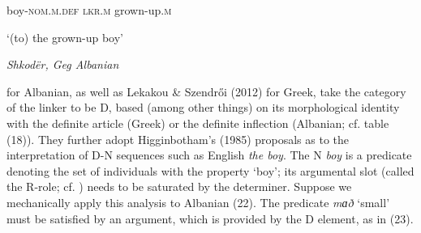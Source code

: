 \documentclass[output=paper]{langsci/langscibook}
\begin{document}
\begin{styleSfondomedioiColorexxi}
  boy-\textsc{nom.m.def   lkr.m}  grown-up.\textsc{m}  
\end{styleSfondomedioiColorexxi}

\begin{styleSfondomedioiColorexxi}
  ‘(to) the grown-up boy’ 
\end{styleSfondomedioiColorexxi}

\begin{styleSfondomedioiColorexxi}
\textit{Shkodër, Geg Albanian} 
\end{styleSfondomedioiColorexxi}

\begin{styleSfondomedioiColorexi}
\citet{FrancoEtAl2015} for Albanian, as well as Lekakou \& Szendrői (2012) for Greek, take the category of the linker to be D, based (among other things) on its morphological identity with the definite article (Greek) or the definite inflection (Albanian; cf. table (18)). They further adopt Higginbotham’s (1985) proposals as to the interpretation of D-N sequences such as English \textit{the boy}. The N \textit{boy} is a predicate denoting the set of individuals with the property ‘boy’; its argumental slot (called the R-role; cf. \citealt{Williams1994}) needs to be saturated by the determiner. Suppose we mechanically apply this analysis to Albanian (22). The predicate \textit{mɑð} ‘small’ must be satisfied by an argument, which is provided by the D element, as in (23).{}  
\end{styleSfondomedioiColorexi}

\begin{styleSfondomedioiColorexi}
\ea%
    \label{ex:key:23}
    \gll\\
        \\
    \glt
    \z

            
\end{styleSfondomedioiColorexi}
\end{document}
